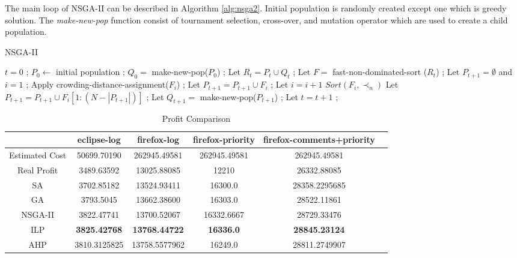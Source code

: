 The main loop of NSGA-II can be described in Algorithm \ref{alg:nsga2}. Initial population is randomly created except one which is greedy solution. The \textit{make-new-pop} function consist of tournament selection, cross-over, and mutation operator which are used to create a child population.

\begin{algorithm}
\caption{NSGA-II}\label{alg:nsga2}
\begin{algorithmic}
    \State $t = 0$ ;
    \State $P_0 \gets$ initial population ;
    \State $Q_0 =$ make-new-pop($P_0$) ;
        \State Let $R_t = P_t \cup Q_t$ ;
        \State Let $F = $ fast-non-dominated-sort ($R_t$) ; %
        \State Let $P_{t+1} = \emptyset$ and $i = 1$ ;
            \State Apply crowding-distance-assignment($F_i$) ; %
            \State Let $P_{t+1} = P_{t+1} \cup F_i$ ;
            \State Let $i = i + 1$
        \EndWhile
        \State $Sort(F_i, \prec_n)$
        \State Let $P_{t+1} = P_{t+1} \cup F_i[1:(N - |P_{t+1}|)]$ ;
        \State Let $Q_{t+1} = $ make-new-pop($P_{t+1}$) ;
        \State Let $t = t + 1$ ;
    \EndWhile
\end{algorithmic}
\end{algorithm}

\begin{table*}
  \caption{Profit Comparison}
  \label{tab:commands}
  \begin{tabular}{cccccl}
    \toprule
    &eclipse-log&firefox-log&firefox-priority&firefox-comments+priority\\
    \midrule
    Estimated Cost&50699.70190&262945.49581&262945.49581&262945.49581 \\
    Real Profit&3489.63592&13025.88085&12210&26332.88085 \\
    \hline
    SA&3702.85182&13524.93411&16300.0&28358.2295685 \\
    GA&3793.5045&13662.38600&16303.0&28522.11861 \\
    NSGA-II&3822.47741&13700.52067&16332.6667&28729.33476 \\
    ILP& \textbf{3825.42768}&\textbf{13768.44722}&\textbf{16336.0}&\textbf{28845.23124} \\
    AHP&3810.3125825&13758.5577962&16249.0&28811.2749907 \\
    \bottomrule
  \end{tabular}
\label{table:DatasetProfit}
\end{table*}

